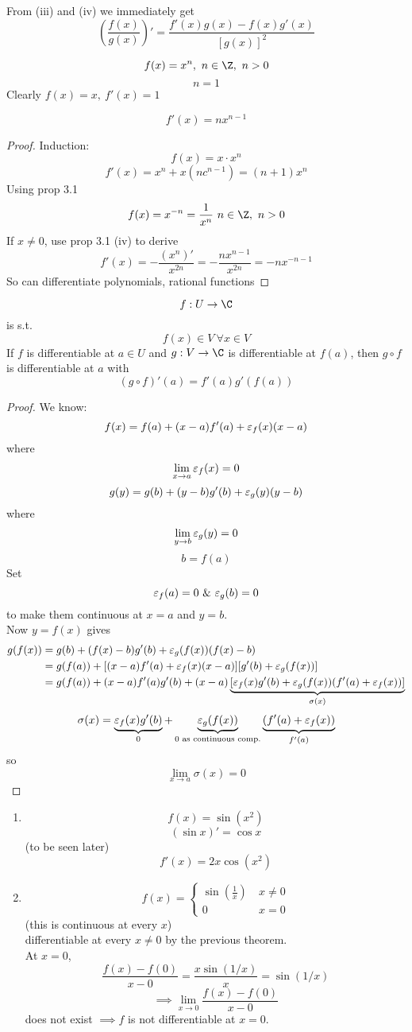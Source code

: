 \begin{remark}
From (iii) and (iv) we immediately get
\[\left(\frac{f(x)}{g(x)}\right)' = \frac{f'(x)g(x) - f(x)g'(x)}{[g(x)]^2}\]
\end{remark}
\begin{example}
\[f(x) = x^n, \ n\in \Z, \ n > 0\]
\[n = 1\]
Clearly  $f(x) = x, \ f'(x) = 1$
\begin{claim}
\[f'(x) = nx^{n-1}\]
\end{claim}
\begin{proof}
Induction:
\[f(x) = x \cdot x^n\]
\[f'(x) = x^n + x(nc^{n-1}) = (n+1)x^n\]
Using prop 3.1
\[f(x) = x^{-n} = \frac{1}{x^n} \ n\in \Z, \ n > 0\]
If $x\neq0$, use prop 3.1 (iv) to derive
\[f'(x) = -\frac{(x^n)'}{x^{2n}} = -\frac{nx^{n-1}}{x^{2n}} = -nx^{-n-1}\]
So can differentiate polynomials, rational functions \tick
\end{proof}
\end{example}
\begin{theorem}
\[f:U\to \C\]
is s.t.
\[f(x)\in V \ \forall x\in V\]
If $f$ is differentiable at $a\in U$ and $g:V\to \C$ is differentiable at $f(a)$, then $g\circ f$ is differentiable at $a$ with
\[(g\circ f)'(a) = f'(a)g'(f(a))\]
\begin{proof}
We know:
\[f(x) = f(a) + (x-a)f'(a) + \varepsilon_f(x)(x-a)\]
where \[\lim_{x\to a} \varepsilon_f(x) = 0\]
\[g(y) = g(b) + (y-b)g'(b) + \varepsilon_g(y)(y-b)\]
where
\[\lim_{y\to b} \varepsilon_g(y) = 0\]
\[b = f(a)\]
Set
\[\varepsilon_f(a) = 0 \ \& \ \varepsilon_g(b) = 0\]
to make them continuous at $x=a$ and $y=b$.\\
Now $y = f(x)$ gives
\begin{align*}
    g(f(x)) &= g(b) + (f(x) - b)g'(b) + \varepsilon_g(f(x))(f(x)-b)\\
    &= g(f(a)) + [(x-a)f'(a) + \varepsilon_f(x)(x-a)][g'(b) + \varepsilon_g(f(x))]\\
    &= g(f(a)) + (x-a)f'(a)g'(b) + (x-a)\underbrace{[\varepsilon_f(x)g'(b) + \varepsilon_g(f(x))(f'(a) + \varepsilon_f(x))]}_{\sigma(x)}
\end{align*}
\[\sigma(x) = \underbrace{\varepsilon_f(x)g'(b)}_0 + \underbrace{\varepsilon_g(f(x))}_{0\text{ as continuous comp.}}\underbrace{(f'(a) + \varepsilon_f(x))}_{f'(a)}\]
so
\[\lim_{x\to a}\sigma(x) = 0\]
\end{proof}
\end{theorem}
\begin{example}
\hfill{ }
\begin{enumerate}
    \item \[f(x) = \sin(x^2)\]
\[(\sin x)' = \cos x\]
(to be seen later)
\[f'(x) = 2x\cos(x^2)\]
\item \[f(x) = \begin{cases} \sin(\frac{1}{x}) \ &x \neq 0\\ 0 \ & x = 0\end{cases}\]
(this is  continuous at every $x$)\\
differentiable at every $x\neq 0$ by the previous theorem.\\
At $x=0$,
\[\frac{f(x) - f(0)}{x-0} = \frac{x\sin(1/x)}{x}= \sin(1/x)\]
\[\implies \lim_{x\to 0} \frac{f(x)-f(0)}{x-0}\]
does not exist $\implies f$ is not differentiable at $x=0$.
\end{enumerate}
\end{example}
